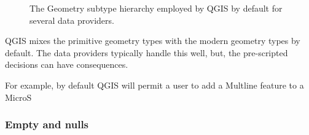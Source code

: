 \documentclass[letterpaper,10pt,english]{sphinxmanual}
\begin{document}
%
\begin{sphinxVerbatim}[commandchars=\\\{\}]
   
  
  
  
\PYG{p}{[}\PYG{p}{]}
\end{sphinxVerbatim}

\begin{figure}[htbp]
\centering
\capstart

\noindent{}
\caption{The Geometry subtype hierarchy employed by QGIS by default for several data providers.}\label{\detokenize{concept:id54}}\label{\detokenize{concept:figuregeomtypeii}}\end{figure}

QGIS mixes the primitive geometry types with the modern geometry types by default.  The data providers typically handle this well, but, the pre-scripted decisions can have consequences.

For example, by default QGIS will permit a user to add a Multline feature to a MicroS


\subsubsection{Empty and nulls}
\label{\detokenize{concept:empty-and-nulls}}
\end{document}
